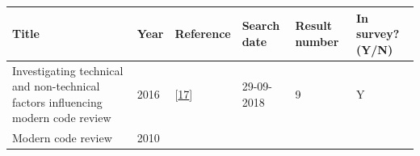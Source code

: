 \documentclass[]{book}
\begin{document}
\begin{longtable}[]{@{}llllll@{}}
\toprule
\begin{minipage}[b]{0.47\columnwidth}\raggedright\strut
Title\strut
\end{minipage} & \begin{minipage}[b]{0.03\columnwidth}\raggedright\strut
Year\strut
\end{minipage} & \begin{minipage}[b]{0.13\columnwidth}\raggedright\strut
Reference\strut
\end{minipage} & \begin{minipage}[b]{0.06\columnwidth}\raggedright\strut
Search date\strut
\end{minipage} & \begin{minipage}[b]{0.07\columnwidth}\raggedright\strut
Result number\strut
\end{minipage} & \begin{minipage}[b]{0.08\columnwidth}\raggedright\strut
In survey? (Y/N)\strut
\end{minipage}\tabularnewline
\midrule
\endhead
\begin{minipage}[t]{0.47\columnwidth}\raggedright\strut
Investigating technical and non-technical factors influencing modern
code review\strut
\end{minipage} & \begin{minipage}[t]{0.03\columnwidth}\raggedright\strut
2016\strut
\end{minipage} & \begin{minipage}[t]{0.13\columnwidth}\raggedright\strut
{[}\protect\hyperlink{ref-baysal2016investigating}{17}{]}\strut
\end{minipage} & \begin{minipage}[t]{0.06\columnwidth}\raggedright\strut
29-09-2018\strut
\end{minipage} & \begin{minipage}[t]{0.07\columnwidth}\raggedright\strut
9\strut
\end{minipage} & \begin{minipage}[t]{0.08\columnwidth}\raggedright\strut
Y\strut
\end{minipage}\tabularnewline
\begin{minipage}[t]{0.47\columnwidth}\raggedright\strut
Modern code review\strut
\end{minipage} & \begin{minipage}[t]{0.03\columnwidth}\raggedright\strut
2010\strut
\end{minipage} & \begin{minipage}[t]{0.13\columnwidth}\raggedright\strut

\end{minipage}
\end{longtable}
\end{document}
